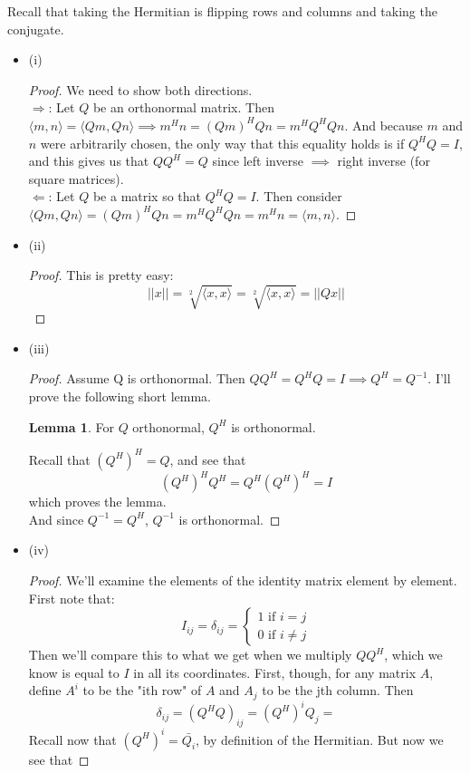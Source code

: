 \documentclass[12pt]{article}
\newenvironment{problem}[2][Problem]{\begin{trivlist}
\item[\hskip \labelsep {\bfseries #1}\hskip \labelsep {\bfseries #2.}]}{\end{trivlist}}
\theoremstyle{definition}
\theoremstyle{definition}
\newtheorem{lemma}{Lemma}[section]
\theoremstyle{definition}
\theoremstyle{definition}
\begin{document}
\begin{problem}{3.10} Recall that taking the Hermitian is flipping rows and columns and taking the conjugate.
\begin{itemize}
\item (i) \begin{proof}
We need to show both directions. \\
$\Rightarrow$: Let $Q$ be an orthonormal matrix. Then $\langle m, n \rangle = \langle Qm, Qn \rangle \implies m^H n = (Qm)^H Qn = m^H Q^H Qn.$ And because $m$ and $n$ were arbitrarily chosen, the only way that this equality holds is if $Q^HQ = I$, and this gives us that $QQ^H = Q$ since left inverse $\implies$ right inverse (for square matrices).  \\
$\Leftarrow$: Let $Q$ be a matrix so that $Q^HQ = I$. Then consider $\langle Qm, Qn \rangle = (Qm)^H Qn = m^HQ^HQn = m^Hn = \langle m, n \rangle$.
\end{proof}
\item (ii)
\begin{proof} This is pretty easy:
$$
||x|| = \sqrt[2]{\langle x, x \rangle} = \sqrt[2]{\langle x, x \rangle} = ||Qx||
$$
\end{proof}
\item (iii) \begin{proof}
Assume Q is orthonormal. Then $QQ^H=Q^HQ = I \implies Q^H = Q^{-1}$. I'll prove the following short lemma.
\begin{lemma} For $Q$ orthonormal, $Q^H$ is orthonormal.
\end{lemma}
Recall that $(Q^H)^H = Q$, and see that 
$$
(Q^H)^HQ^H = Q^H(Q^H)^H = I 
$$ 
which proves the lemma. \\
And since $Q^{-1} = Q^H$, $Q^{-1}$ is orthonormal. 
\end{proof}
\item (iv) 
\begin{proof}
We'll examine the elements of the identity matrix element by element. First note that: 
$$
I_{ij} = \delta_{ij} = \begin{cases} 1 \text{ if } i = j \\ 
0 \text{ if } i \neq j 
\end{cases}
$$ Then we'll compare this to what we get when we multiply $QQ^H$, which we know is equal to $I$ in all its coordinates. First, though, for any matrix $A$, define $A^i$ to be the "ith row" of $A$ and $A_j$ to be the jth column. Then
$$ \delta_{ij} = (Q^HQ)_{ij} = (Q^H)^i Q_j = $$
Recall now that $(Q^H)^i = \bar{Q_i}$, by definition of the Hermitian. But now we see that 

\end{proof}
\end{itemize}
\end{problem}
\end{document}

